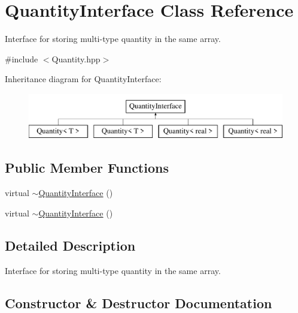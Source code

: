 \hypertarget{classQuantityInterface}{}\section{Quantity\+Interface Class Reference}
\label{classQuantityInterface}


Interface for storing multi-\/type quantity in the same array.  




{\ttfamily \#include $<$Quantity.\+hpp$>$}

Inheritance diagram for Quantity\+Interface\+:\begin{figure}[H]
\begin{center}
\leavevmode
\includegraphics[height=2.000000cm]{classQuantityInterface}
\end{center}
\end{figure}
\subsection*{Public Member Functions}
\begin{DoxyCompactItemize}
\item 
virtual \hyperlink{classQuantityInterface_acb39ddd398f6d615f28051bb32c25bbe}{$\sim$\+Quantity\+Interface} ()
\item 
virtual \hyperlink{classQuantityInterface_acb39ddd398f6d615f28051bb32c25bbe}{$\sim$\+Quantity\+Interface} ()
\end{DoxyCompactItemize}


\subsection{Detailed Description}
Interface for storing multi-\/type quantity in the same array. 

\subsection{Constructor \& Destructor Documentation}
\mbox{\label{classQuantityInterface_acb39ddd398f6d615f28051bb32c25bbe}} 
